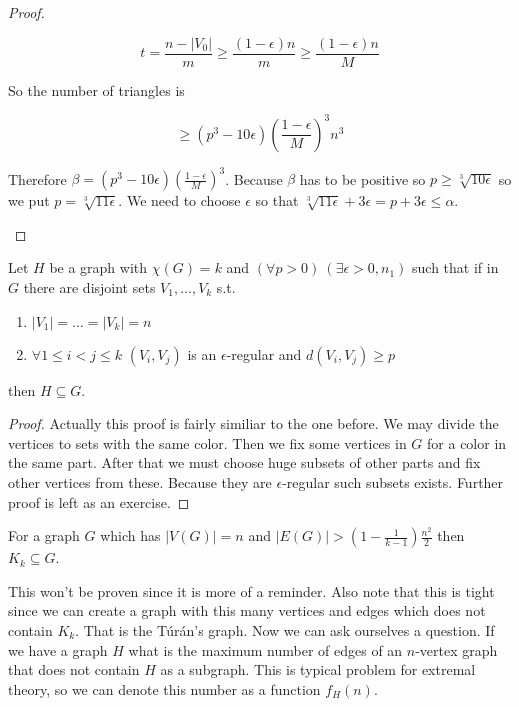 \begin{proof}
\begin{enumerate}[(a)]
		$$
		t = \frac{n - |V_0|}{m} \geq \frac{(1-\epsilon)n}{m} \geq \frac{(1 - \epsilon)n}{M}
		$$
		
		So the number of triangles is
		
		$$
		\geq (p^3 - 10\epsilon) \left( \frac{1-\epsilon}{M} \right)^3 n^3
		$$
		
		Therefore $\beta = (p^3 - 10\epsilon) \left( \frac{1-\epsilon}{M} \right)^3$. Because $\beta$ has to be positive so $p \geq \sqrt[3]{10 \epsilon}$ so we put $p = \sqrt[3]{11\epsilon}$. We need to choose $\epsilon$ so that $\sqrt[3]{11\epsilon} + 3\epsilon = p + 3\epsilon \leq \alpha$.
	\end{enumerate}
\end{proof}

\begin{lemma}
	Let $H$ be a graph with $\chi(G) = k$ and $(\forall p > 0) \ (\exists \epsilon > 0, n_1)$ such that if in $G$ there are disjoint sets $V_1, \dots, V_k$ s.t.
	
	\begin{enumerate}
		\item $|V_1| = \dots = |V_{k}| = n$
		\item $\forall 1 \leq i < j \leq k$ $(V_i, V_j)$ is an $\epsilon$-regular and $d(V_i, V_j) \geq p$
	\end{enumerate}
	
	then $H \subseteq G$.
\end{lemma}

\begin{proof}
	Actually this proof is fairly similiar to the one before. We may divide the vertices to sets with the same color. Then we fix some vertices in $G$ for a color in the same part. After that we must choose huge subsets of other parts and fix other vertices from these. Because they are $\epsilon$-regular such subsets exists. Further proof is left as an exercise.
\end{proof}

\begin{thm}[Túrán]
	For a graph $G$ which has $|V(G)| = n$ and $|E(G)| > \left(1 - \frac{1}{k-1}\right) \frac{n^2}{2}$ then $K_k \subseteq G$.
\end{thm}

This won't be proven since it is more of a reminder. Also note that this is tight since we can create a graph with this many vertices and edges which does not contain $K_k$. That is the Túrán's graph. Now we can ask ourselves a question. If we have a graph $H$ what is the maximum number of edges of an $n$-vertex graph that does not contain $H$ as a subgraph. This is typical problem for extremal theory, so we can denote this number as a function $f_H(n)$.

